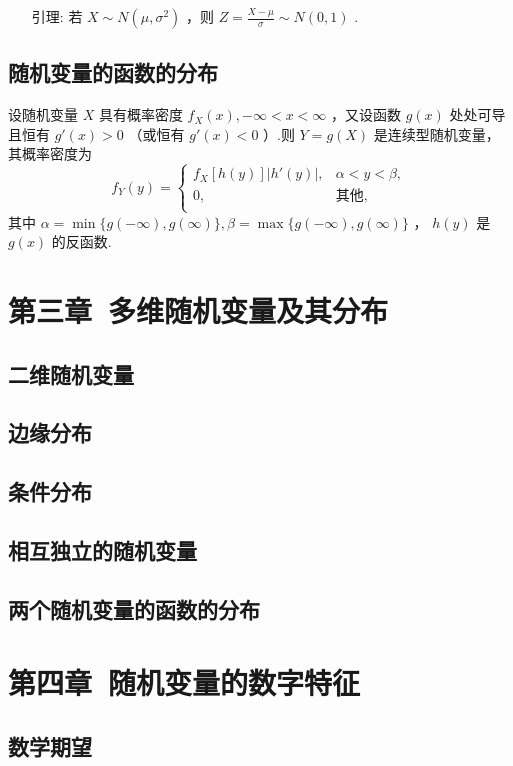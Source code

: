 \documentclass[UTF8,10pt]{ctexart}
\begin{document}
	\begin{itemize}
		\item [引理:] {
			若 $ X \sim N( \mu , \sigma ^{2}) $ ，则 $ Z= \frac{X- \mu }{ \sigma } \sim N(0,1) $ .
		}
	\end{itemize}
	
	\subsection{随机变量的函数的分布}
	
	设随机变量 $ X $ 具有概率密度 $ f_X(x),- \infty <x< \infty $ ，又设函数 $ g(x) $ 处处可导且恒有 $ g'(x)>0 $ （或恒有 $ g'(x)<0 $ ）.则 $ Y=g(X) $ 是连续型随机变量，其概率密度为 $$ f_{Y}(y)= \begin{cases} f_{X}[h(y)]|h'(y)|, & \alpha <y< \beta, \\ 0, & \mbox{其他},\\ \end{cases} $$ 其中 $ \alpha = \min\{g(- \infty ),g( \infty )\}, \beta = \max\{g(- \infty ),g( \infty )\} $ ， $ h(y) $ 是 $ g(x) $ 的反函数.
	
	\section{第三章\ 多维随机变量及其分布}
	\subsection{二维随机变量}
	\subsection{边缘分布}
	\subsection{条件分布}
	\subsection{相互独立的随机变量}
	\subsection{两个随机变量的函数的分布}
	\section{第四章\ 随机变量的数字特征}
	\subsection{数学期望}
\end{document}
